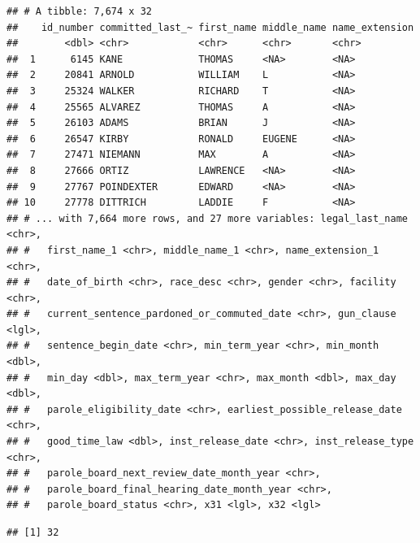 \documentclass[]{book}
\newenvironment{Shaded}{\begin{snugshade}}{\end{snugshade}}
\newcommand{\KeywordTok}[1]{\textcolor[rgb]{0.13,0.29,0.53}{\textbf{#1}}}
\newcommand{\NormalTok}[1]{#1}
\newcommand{\OperatorTok}[1]{\textcolor[rgb]{0.81,0.36,0.00}{\textbf{#1}}}
\newcommand{\StringTok}[1]{\textcolor[rgb]{0.31,0.60,0.02}{#1}}
\begin{document}
\begin{verbatim}
## # A tibble: 7,674 x 32
##    id_number committed_last_~ first_name middle_name name_extension
##        <dbl> <chr>            <chr>      <chr>       <chr>         
##  1      6145 KANE             THOMAS     <NA>        <NA>          
##  2     20841 ARNOLD           WILLIAM    L           <NA>          
##  3     25324 WALKER           RICHARD    T           <NA>          
##  4     25565 ALVAREZ          THOMAS     A           <NA>          
##  5     26103 ADAMS            BRIAN      J           <NA>          
##  6     26547 KIRBY            RONALD     EUGENE      <NA>          
##  7     27471 NIEMANN          MAX        A           <NA>          
##  8     27666 ORTIZ            LAWRENCE   <NA>        <NA>          
##  9     27767 POINDEXTER       EDWARD     <NA>        <NA>          
## 10     27778 DITTRICH         LADDIE     F           <NA>          
## # ... with 7,664 more rows, and 27 more variables: legal_last_name <chr>,
## #   first_name_1 <chr>, middle_name_1 <chr>, name_extension_1 <chr>,
## #   date_of_birth <chr>, race_desc <chr>, gender <chr>, facility <chr>,
## #   current_sentence_pardoned_or_commuted_date <chr>, gun_clause <lgl>,
## #   sentence_begin_date <chr>, min_term_year <chr>, min_month <dbl>,
## #   min_day <dbl>, max_term_year <chr>, max_month <dbl>, max_day <dbl>,
## #   parole_eligibility_date <chr>, earliest_possible_release_date <chr>,
## #   good_time_law <dbl>, inst_release_date <chr>, inst_release_type <chr>,
## #   parole_board_next_review_date_month_year <chr>,
## #   parole_board_final_hearing_date_month_year <chr>,
## #   parole_board_status <chr>, x31 <lgl>, x32 <lgl>
\end{verbatim}

\begin{Shaded}
\end{Shaded}

\begin{verbatim}
## [1] 32
\end{verbatim}

\begin{Shaded}
\end{Shaded}
\end{document}
